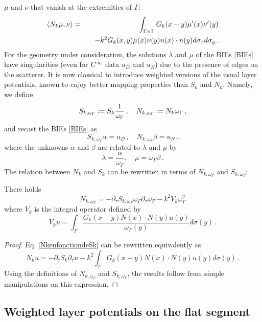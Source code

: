 \documentclass[a4paper]{article}
\begin{document}
$\mu$ and $\nu$ that vanish at the extremities of $\Gamma$: 
\begin{eqnarray}
\label{NkenfonctiondeSk}
\left\langle N_k \mu,\nu\right\rangle &=& \int_{\Gamma\times \Gamma} G_k(x-y) \mu'(x) \nu'(y) \nonumber\\
&& \quad - k^2 G_k(x,y) \mu(x) \nu(y) n(x) \cdot n(y) d\sigma_x d\sigma_y\,.
\end{eqnarray}
For the geometry under consideration, the solutions $\lambda$ and $\mu$ of the BIEs \eqref{BIEs} have singularities (even for $C^{\infty}$ data $u_D$ and $u_N$) due to the presence of edges on the scatterer. It is now classical to introduce weighted versions of the usual layer potentials, known to enjoy better mapping properties than $S_k$ and $N_k$. Namely, we define
\begin{equation}
\label{weightedBIOs}
S_{k,\omega_\Gamma} \mathrel{\mathop:}= S_k \frac{1}{\omega_\Gamma}\,,\quad N_{k,\omega_\Gamma} \mathrel{\mathop:}= N_k \omega_\Gamma\,,
\end{equation}
and recast the BIEs \eqref{BIEs} as 
\begin{equation}
\label{weightedBIEs}
S_{k,\omega_\Gamma}\alpha = u_D\,, \quad N_{k,\omega_\Gamma}\beta = u_N\,.
\end{equation}
where the unknowns $\alpha$ and $\beta$ are related to $\lambda$ and $\mu$ by 
\[\lambda = \frac{\alpha}{\omega_\Gamma}, \quad \mu = \omega_\Gamma \beta\,.\]
The relation between $N_k$ and $S_k$ can be rewritten in terms of $N_{k,\omega_\Gamma}$ and $S_{k,\omega_\Gamma}$:
\begin{Lem}
	\label{NkomegaSkomega}
	There holds 
	\[N_{k,\omega_\Gamma} = -\partial_\tau S_{k,\omega_\Gamma} \omega_\Gamma \partial_\tau \omega_\Gamma - k^2 V_k \omega_\Gamma^2\]
	where $V_k$ is the integral operator defined by 
	\[V_k u = \int_{\Gamma} \frac{G_k(x - y) N(x) \cdot N(y) u(y)}{\omega_\Gamma(y)} d\sigma(y)\,. \]
\end{Lem}
\begin{proof}
	Eq. \eqref{NkenfonctiondeSk} can be rewritten equivalently as 
	\[N_k u = -\partial_\tau S_k \partial_\tau u - k^2 \int_{\Gamma} G_k(x - y) N(x) \cdot N(y) u(y) d\sigma(y)\,. \]
	Using the definitions of $N_{k,\omega_\Gamma}$ and $S_{k,\omega_\Gamma}$, the results follow from simple manipulations on this expression. 
\end{proof}

\subsection{Weighted layer potentials on the flat segment}
\end{document}
